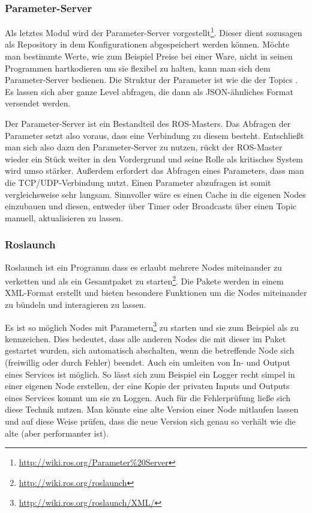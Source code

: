 \subsubsection*{Parameter-Server}
Als letztes Modul wird der Parameter-Server vorgestellt\footnote{\url{http://wiki.ros.org/Parameter\%20Server}}. Dieser dient sozusagen als Repository in dem Konfigurationen abgespeichert werden können. Möchte man bestimmte Werte, wie zum Beispiel Preise bei einer Ware, nicht in seinen Programmen hartkodieren um sie flexibel zu halten, kann man sich dem Parameter-Server bedienen. Die Struktur der Parameter ist wie die der Topics . Es lassen sich aber ganze Level abfragen, die dann als JSON-ähnliches Format versendet werden.

Der Parameter-Server ist ein Bestandteil des ROS-Masters. Das Abfragen der Parameter setzt also voraus, dass eine Verbindung zu diesem besteht. Entschließt man sich also dazu den Parameter-Server zu nutzen, rückt der ROS-Master wieder ein Stück weiter in den Vordergrund und seine Rolle als kritisches System wird umso stärker. Außerdem erfordert das Abfragen eines Parameters, dass man die TCP/UDP-Verbindung nutzt. Einen Parameter abzufragen ist somit vergleichsweise sehr langsam. Sinnvoller wäre es einen Cache in die eigenen Nodes einzubauen und diesen, entweder über Timer oder Broadcasts über einen Topic manuell, aktualisieren zu lassen.

\subsubsection*{Roslaunch}
Roslaunch ist ein Programm dass es erlaubt mehrere Nodes miteinander zu verketten und als ein Gesamtpaket zu starten\footnote{\url{http://wiki.ros.org/roslaunch}}. Die Pakete werden in einem XML-Format erstellt und bieten besondere Funktionen um die Nodes miteinander zu bündeln und interagieren zu lassen.

Es ist so möglich Nodes mit Parametern\footnote{\url{http://wiki.ros.org/roslaunch/XML/}} zu starten und sie zum Beispiel als  zu kennzeichen. Dies bedeutet, dass alle anderen Nodes die mit dieser im Paket gestartet wurden, sich automatisch abschalten, wenn die betreffende Node sich (freiwillig oder durch Fehler) beendet.
Auch ein umleiten von In- und Output eines Services ist möglich. So lässt sich zum Beispiel ein Logger recht simpel in einer eigenen Node erstellen, der eine Kopie der privaten Inputs und Outputs eines Services kommt um sie zu Loggen. Auch für die Fehlerprüfung ließe sich diese Technik nutzen. Man könnte eine alte Version einer Node mitlaufen lassen und auf diese Weise prüfen, dass die neue Version sich genau so verhält wie die alte (aber performanter ist).
